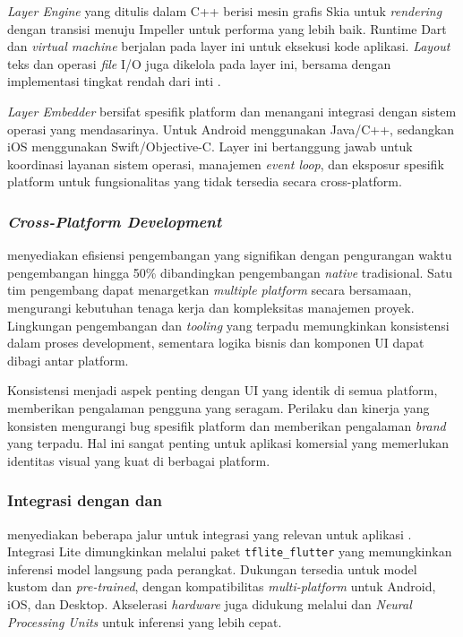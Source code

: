 \emph{Layer Engine} yang ditulis dalam C++ berisi mesin grafis Skia untuk \emph{rendering} dengan transisi menuju Impeller untuk performa yang lebih baik. Runtime Dart dan \emph{virtual machine} berjalan pada layer ini untuk eksekusi kode aplikasi. \emph{Layout} teks dan operasi \emph{file} I/O juga dikelola pada layer ini, bersama dengan implementasi tingkat rendah dari \api inti \flutter.

\emph{Layer Embedder} bersifat spesifik platform dan menangani integrasi dengan sistem operasi yang mendasarinya. Untuk Android menggunakan Java/C++, sedangkan iOS menggunakan Swift/Objective-C. Layer ini bertanggung jawab untuk koordinasi layanan sistem operasi, manajemen \emph{event loop}, dan eksposur \api spesifik platform untuk fungsionalitas yang tidak tersedia secara cross-platform.

\subsubsection{\emph{Cross-Platform Development}}

\flutter menyediakan efisiensi pengembangan yang signifikan dengan pengurangan waktu pengembangan hingga 50\% dibandingkan pengembangan \emph{native} tradisional. Satu tim pengembang dapat menargetkan \emph{multiple platform} secara bersamaan, mengurangi kebutuhan tenaga kerja dan kompleksitas manajemen proyek. Lingkungan pengembangan dan \emph{tooling} yang terpadu memungkinkan konsistensi dalam proses development, sementara logika bisnis dan komponen UI dapat dibagi antar platform.

Konsistensi menjadi aspek penting dengan UI yang identik di semua platform, memberikan pengalaman pengguna yang seragam. Perilaku dan kinerja yang konsisten mengurangi bug spesifik platform dan memberikan pengalaman \emph{brand} yang terpadu. Hal ini sangat penting untuk aplikasi komersial yang memerlukan identitas visual yang kuat di berbagai platform.

\subsubsection{Integrasi dengan \ml dan \cv}

\flutter menyediakan beberapa jalur untuk integrasi \ml yang relevan untuk aplikasi \cv. Integrasi \tensorflow Lite dimungkinkan melalui paket \texttt{tflite\_flutter} yang memungkinkan inferensi model langsung pada perangkat. Dukungan tersedia untuk model kustom dan \emph{pre-trained}, dengan kompatibilitas \emph{multi-platform} untuk Android, iOS, dan Desktop. Akselerasi \emph{hardware} juga didukung melalui \gpu dan \emph{Neural Processing Units} untuk inferensi yang lebih cepat.

